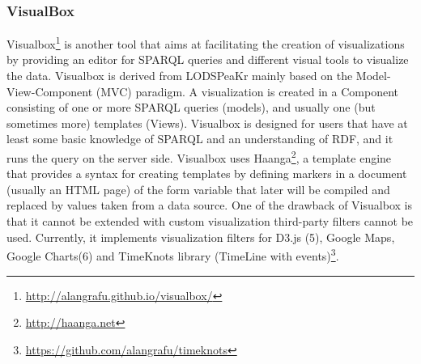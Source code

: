 
\subsubsection{VisualBox}

Visualbox\footnote{\url{http://alangrafu.github.io/visualbox/}} is another tool that aims at facilitating the creation of visualizations by providing an editor for SPARQL queries and different
visual tools to visualize the data. Visualbox is derived from LODSPeaKr \cite{graves13} mainly based on the Model-View-Component (MVC) paradigm. A visualization is created in a Component consisting of one or more SPARQL queries (models), and usually one (but sometimes more) templates (Views).
Visualbox is designed for users that have at least some basic knowledge of SPARQL and an understanding of RDF, and it runs the query on the server side. Visualbox uses Haanga\footnote{\url{http://haanga.net}}, a template engine that provides a syntax for creating templates by defining markers in a document (usually an HTML page) of the form {{variable}} that later will be compiled and replaced by values taken from a data source. One of the drawback of Visualbox is that it cannot be extended with custom visualization third-party filters cannot be used.
Currently, it implements visualization filters for D3.js (5), Google Maps, Google Charts(6) and TimeKnots library (TimeLine with events)\footnote{\url{https://github.com/alangrafu/timeknots}}.


